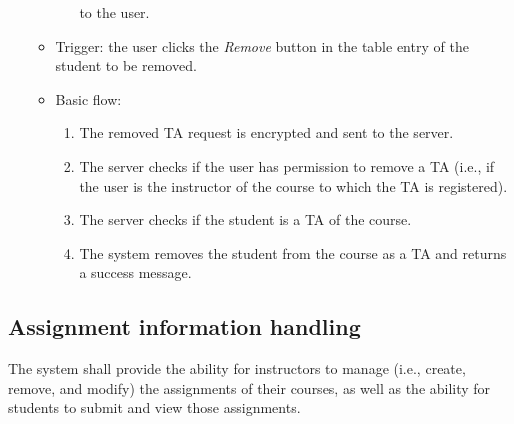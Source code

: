 \begin{enumerate}
\begin{itemize}
\begin{itemize}
                to the user.
        \end{itemize}
    \item Trigger: the user clicks the \emph{Remove} button in the table entry
                of the student to be removed.
    \item Basic flow:
        \begin{enumerate}
            \item The removed TA request is encrypted and sent to the server.
            \item The server checks if the user has permission to remove a
                TA (i.e., if the user is the instructor of the course to which
                the TA is registered).
            \item The server checks if the student is a TA of the course.
            \item The system removes the student from the course as a TA
                and returns a success message.
        \end{enumerate}
\end{itemize}

\end{enumerate}

\subsection{Assignment information handling}
The system shall provide the ability for instructors to manage (i.e., create,
remove, and modify) the assignments of their courses, as well as the ability for
students to submit and view those assignments.

